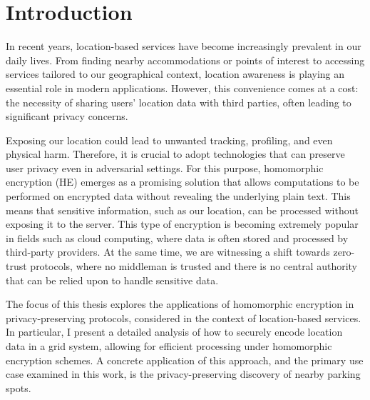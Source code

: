 \chapter{Introduction} \label{chap:intro}

%
%

In recent years, location-based services have become increasingly prevalent in our daily lives. From finding nearby accommodations or points of interest to accessing services tailored to our geographical context, location awareness is playing an essential role in modern applications. However, this convenience comes at a cost: the necessity of sharing users' location data with third parties, often leading to significant privacy concerns.

Exposing our location could lead to unwanted tracking, profiling, and even physical harm. Therefore, it is crucial to adopt technologies that can preserve user privacy even in adversarial settings. For this purpose, homomorphic encryption (HE) emerges as a promising solution that allows computations to be performed on encrypted data without revealing the underlying plain text. This means that sensitive information, such as our location, can be processed without exposing it to the server. This type of encryption is becoming extremely popular in fields such as cloud computing, where data is often stored and processed by third-party providers. 
At the same time, we are witnessing a shift towards zero-trust protocols, where no middleman is trusted and there is no central authority that can be relied upon to handle sensitive data. 


The focus of this thesis explores the applications of homomorphic encryption in privacy-preserving protocols, considered in the context of location-based services. In particular, I present a detailed analysis of how to securely encode location data in a grid system, allowing for efficient processing under homomorphic encryption schemes. 
A concrete application of this approach, and the primary use case examined in this work, is the privacy-preserving discovery of nearby parking spots.

